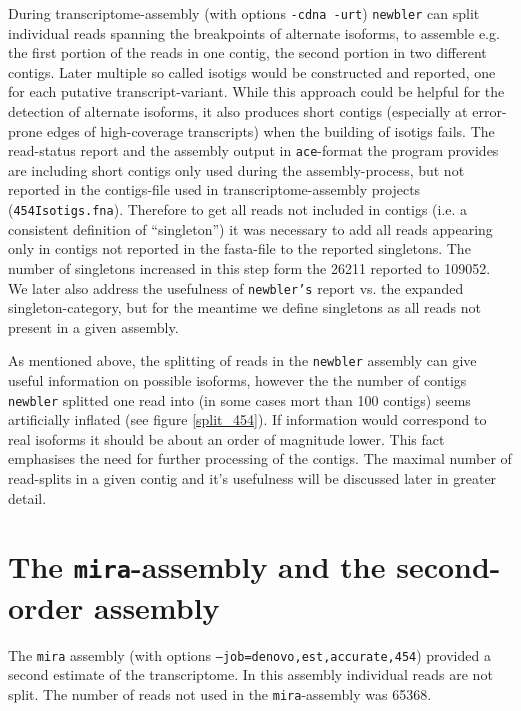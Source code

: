 During transcriptome-assembly (with options \texttt{-cdna -urt})
\texttt{newbler} can split individual reads spanning the breakpoints
of alternate isoforms, to assemble e.g. the first portion of the reads
in one contig, the second portion in two different contigs. Later
multiple so called isotigs would be constructed and reported, one for
each putative transcript-variant. While this approach could be helpful
for the detection of alternate isoforms, it also produces short
contigs (especially at error-prone edges of high-coverage transcripts)
when the building of isotigs fails. The read-status report and the
assembly output in \texttt{ace}-format the program provides are
including short contigs only used during the assembly-process, but not
reported in the contigs-file used in transcriptome-assembly projects
(\texttt{454Isotigs.fna}). Therefore to get all reads not included in
contigs (i.e. a consistent definition of ``singleton'') it was
necessary to add all reads appearing only in contigs not reported in
the fasta-file to the reported singletons. The number of singletons
increased in this step form the 26211
reported to 109052. We later also address the
usefulness of \texttt{newbler's} report vs. the expanded
singleton-category, but for the meantime we define singletons as all
reads not present in a given assembly.


As mentioned above, the splitting of reads in the \texttt{newbler}
assembly can give useful information on possible isoforms, however the
the number of contigs \texttt{newbler} splitted one read into (in some
cases mort than 100 contigs) seems artificially inflated (see figure
\ref{split_454}). If information would correspond to real isoforms it
should be about an order of magnitude lower. This fact emphasises the
need for further processing of the contigs. The maximal number of
read-splits in a given contig and it's usefulness will be discussed
later in greater detail.

\section{The \texttt{mira}-assembly and the second-order assembly}
\label{sec:assembly-sec}

The \texttt{mira} assembly (with options
\texttt{--job=denovo,est,accurate,454}) provided a second estimate of
the transcriptome. In this assembly individual reads are not
split. The number of reads not used in the \texttt{mira}-assembly was
65368.

